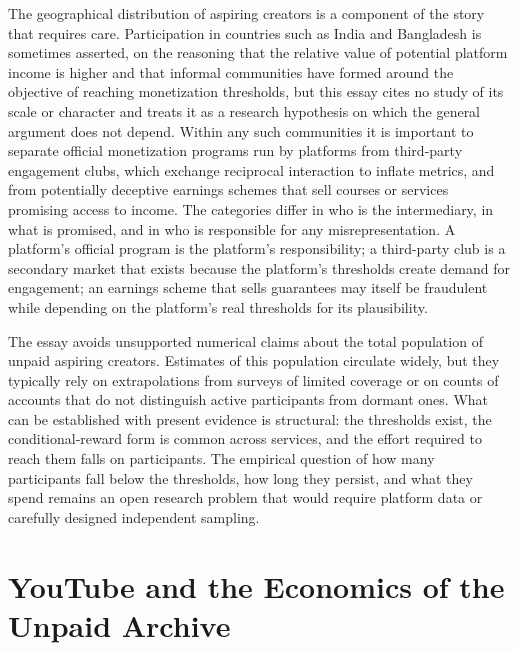 \documentclass[11pt]{article}
\theoremstyle{remark}
\begin{document}
The geographical distribution of aspiring creators is a component of the story that requires care. Participation in countries such as India and Bangladesh is sometimes asserted, on the reasoning that the relative value of potential platform income is higher and that informal communities have formed around the objective of reaching monetization thresholds, but this essay cites no study of its scale or character and treats it as a research hypothesis on which the general argument does not depend. Within any such communities it is important to separate official monetization programs run by platforms from third-party engagement clubs, which exchange reciprocal interaction to inflate metrics, and from potentially deceptive earnings schemes that sell courses or services promising access to income. The categories differ in who is the intermediary, in what is promised, and in who is responsible for any misrepresentation. A platform's official program is the platform's responsibility; a third-party club is a secondary market that exists because the platform's thresholds create demand for engagement; an earnings scheme that sells guarantees may itself be fraudulent while depending on the platform's real thresholds for its plausibility.

The essay avoids unsupported numerical claims about the total population of unpaid aspiring creators. Estimates of this population circulate widely, but they typically rely on extrapolations from surveys of limited coverage or on counts of accounts that do not distinguish active participants from dormant ones. What can be established with present evidence is structural: the thresholds exist, the conditional-reward form is common across services, and the effort required to reach them falls on participants. The empirical question of how many participants fall below the thresholds, how long they persist, and what they spend remains an open research problem that would require platform data or carefully designed independent sampling.

\section{YouTube and the Economics of the Unpaid Archive}
\end{document}
